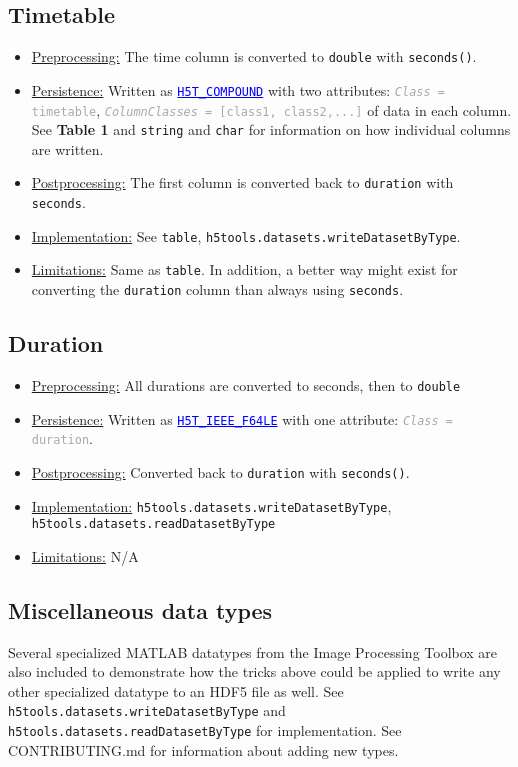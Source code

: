 \documentclass[11pt]{exam}
\newcommand\myurl[1]{\textcolor{blue}{\underline{#1}}}
\newcommand\myfcn[1]{\colorbox{codegray}{\textcolor{codeblue}{\texttt{#1}}}}
\newcommand\matfcn[1]{\textcolor{darkteal}{\texttt{#1}}}
\newcommand\hdftype[1]{\texttt{\myurl{#1}}}
\newcommand\myatt[2]{\textcolor{darkgray}{\texttt{\textit{#1} = #2}}}
\begin{document}
		\subsection{Timetable}
		\noindent
		\begin{itemize}
			\item \underline{Preprocessing:} The time column is converted to \texttt{double} with \matfcn{seconds()}. 
			\item \underline{Persistence:} Written as \hdftype{H5T\_COMPOUND} with two attributes: \myatt{Class}{timetable}, \myatt{ColumnClasses}{[class1, class2,...]} of data in each column. See \textbf{Table 1} and \texttt{string} and \texttt{char} for information on how individual columns are written.
			\item \underline{Postprocessing:} The first column is converted back to \texttt{duration} with \matfcn{seconds}.
			\item \underline{Implementation:} See \texttt{table}, \myfcn{h5tools.datasets.writeDatasetByType}. 
			\item \underline{Limitations:} Same as \texttt{table}. In addition, a better way might exist for converting the \texttt{duration} column than always using \matfcn{seconds}.
		\end{itemize}

		\subsection{Duration}
		\noindent
		\begin{itemize}
			\item \underline{Preprocessing:} All durations are converted to seconds, then to \texttt{double}
			\item \underline{Persistence:} Written as \hdftype{H5T\_IEEE\_F64LE} with one attribute: \myatt{Class}{duration}.
			\item \underline{Postprocessing:} Converted back to \texttt{duration} with \matfcn{seconds()}.
			\item \underline{Implementation:} \myfcn{h5tools.datasets.writeDatasetByType}, \myfcn{h5tools.datasets.readDatasetByType}
			\item \underline{Limitations:} N/A
		\end{itemize}

        \subsection{Miscellaneous data types}
        \noindent Several specialized MATLAB datatypes from the Image Processing Toolbox are also included to demonstrate how the tricks above could be applied to write any other specialized datatype to an HDF5 file as well. See \myfcn{h5tools.datasets.writeDatasetByType} and \myfcn{h5tools.datasets.readDatasetByType} for implementation. See CONTRIBUTING.md for information about adding new types.
\end{document}
